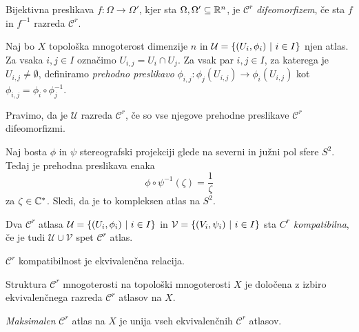 \begin{definicija}
Bijektivna preslikava $f \colon \Omega \to \Omega'$, kjer sta
$\Omega, \Omega' \subseteq \mathbb{R}^n$, je $\mathcal{C}^r$
\emph{difeomorfizem}, če sta
$f$ in $f^{-1}$ razreda $\mathcal{C}^r$.
\end{definicija}

\begin{definicija}
Naj bo $X$ topološka mnogoterost dimenzije $n$ in
$\mathcal{U} = \left\{(U_i, \phi_i)~\middle\vert~i \in I\right\}$ njen atlas. Za vsaka
$i, j \in I$ označimo $U_{i,j} = U_i \cap U_j$. Za vsak par
$i, j \in I$, za katerega je $U_{i,j} \ne \emptyset$, definiramo
\emph{prehodno preslikavo}
$\phi_{i,j} \colon \phi_j(U_{i,j}) \to \phi_i(U_{i,j})$ kot
$\phi_{i,j} = \phi_i \circ \phi_j^{-1}$.

Pravimo, da je $\mathcal{U}$ razreda $\mathcal{C}^r$, če so vse
njegove prehodne preslikave $\mathcal{C}^r$ difeomorfizmi.
\end{definicija}

\begin{primer}
Naj bosta $\phi$ in $\psi$ stereografski projekciji glede na
severni in južni pol sfere $S^2$. Tedaj je prehodna preslikava
enaka
\[
\phi \circ \psi^{-1}(\zeta) = \frac{1}{\zeta}
\]
za $\zeta \in \mathbb{C}^*$. Sledi, da je to kompleksen atlas na $S^2$.
\end{primer}

\begin{definicija}
Dva $\mathcal{C}^r$ atlasa
$\mathcal{U} = \left\{(U_i, \phi_i)~\middle\vert~i \in I\right\}$ in
$\mathcal{V} = \left\{(V_i, \psi_i)~\middle\vert~i \in I\right\}$ sta
\emph{$C^r$ kompatibilna},
če je tudi $\mathcal{U} \cup \mathcal{V}$ spet $\mathcal{C}^r$
atlas.
\end{definicija}

\begin{opomba}
$\mathcal{C}^r$ kompatibilnost je ekvivalenčna relacija.
\end{opomba}

\begin{opomba}
Struktura $\mathcal{C}^r$ mnogoterosti na topološki mnogoterosti
$X$ je določena z izbiro ekvivalenčnega razreda $\mathcal{C}^r$
atlasov na $X$.
\end{opomba}

\begin{definicija}
\emph{Maksimalen}
$\mathcal{C}^r$ atlas na $X$ je unija vseh ekvivalenčnih
$\mathcal{C}^r$ atlasov.
\end{definicija}

